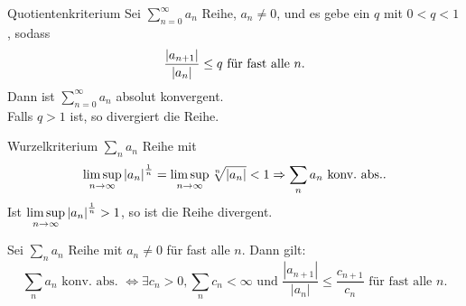 \documentclass[main.tex]{subfiles}
\begin{document}
\begin{karte}{Quotientenkriterium}
    Sei \( \sum_{n=0}^{\infty} a_n \) Reihe, 
    \( a_n\neq 0 \), und es gebe ein \(q\) mit 
    \( 0<q<1 \), sodass
    \[ \frac{\left| a_{n+1} \right|}{\left| a_n \right|} 
    \leq q \text{ für fast alle }n. \]
    Dann ist \( \sum_{n=0}^{\infty} a_n \) 
    absolut konvergent.\\
    Falls \( q > 1 \) ist, so divergiert die 
    Reihe.
\end{karte}
\begin{karte}{Wurzelkriterium}
    \( \sum_{n}a_n \) Reihe mit 
    \[ \limsup\limits_{n\rightarrow\infty} 
    \left| a_n \right|^{\frac{1}{n}} 
    = \limsup\limits_{n\rightarrow\infty} 
    \sqrt[n]{\left| a_n \right|} < 1 
    \Rightarrow \sum_n a_n 
    \text{ konv.\ abs.}.\]
    Ist \( \limsup\limits_{n\rightarrow\infty} 
    \left| a_n \right|^{\frac{1}{n}} > 1 \), 
    so ist die Reihe divergent.
\end{karte}
\begin{karte}{}
    Sei \( \sum_n a_n \) Reihe mit 
    \(a_n \neq 0 \) für fast alle \(n\). 
    Dann gilt:
    \[ \sum_n a_n \text{ konv.\ abs.\ } 
    \Leftrightarrow \exists c_n > 0, 
    \sum_n c_n < \infty \text{ und } 
    \frac{|a_{n+1}|}{|a_n|} \leq 
    \frac{c_{n+1}}{c_n} 
    \text{ für fast alle }n. \]
\end{karte}
\end{document}
